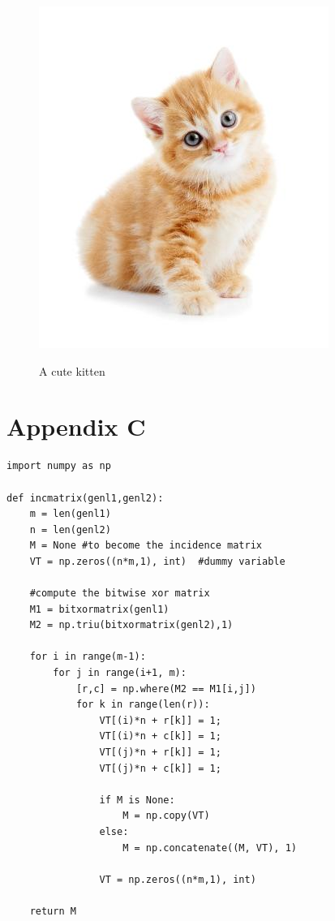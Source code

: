 \documentclass{stats_apa}
\begin{document}
\begin{figure}[H]
	\caption{A cute kitten}
	\includegraphics[scale=0.5]{kitten.jpg} 
	\label{fig:gray1}
\end{figure}

\newpage

\section*{Appendix C}
\label{app: C}
\begin{lstlisting}
import numpy as np
 
def incmatrix(genl1,genl2):
    m = len(genl1)
    n = len(genl2)
    M = None #to become the incidence matrix
    VT = np.zeros((n*m,1), int)  #dummy variable
 
    #compute the bitwise xor matrix
    M1 = bitxormatrix(genl1)
    M2 = np.triu(bitxormatrix(genl2),1) 
 
    for i in range(m-1):
        for j in range(i+1, m):
            [r,c] = np.where(M2 == M1[i,j])
            for k in range(len(r)):
                VT[(i)*n + r[k]] = 1;
                VT[(i)*n + c[k]] = 1;
                VT[(j)*n + r[k]] = 1;
                VT[(j)*n + c[k]] = 1;
 
                if M is None:
                    M = np.copy(VT)
                else:
                    M = np.concatenate((M, VT), 1)
 
                VT = np.zeros((n*m,1), int)
 
    return M
\end{lstlisting}
\end{document}
